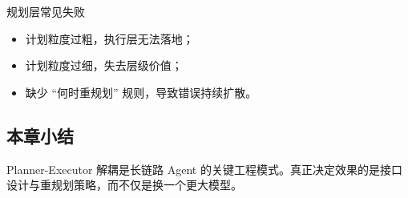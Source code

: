 \begin{warningbox}{规划层常见失败}
\begin{itemize}
    \item 计划粒度过粗，执行层无法落地；
    \item 计划粒度过细，失去层级价值；
    \item 缺少 ``何时重规划'' 规则，导致错误持续扩散。
\end{itemize}
\end{warningbox}

\subsection{本章小结}
Planner-Executor 解耦是长链路 Agent 的关键工程模式。真正决定效果的是接口设计与重规划策略，而不仅是换一个更大模型。

